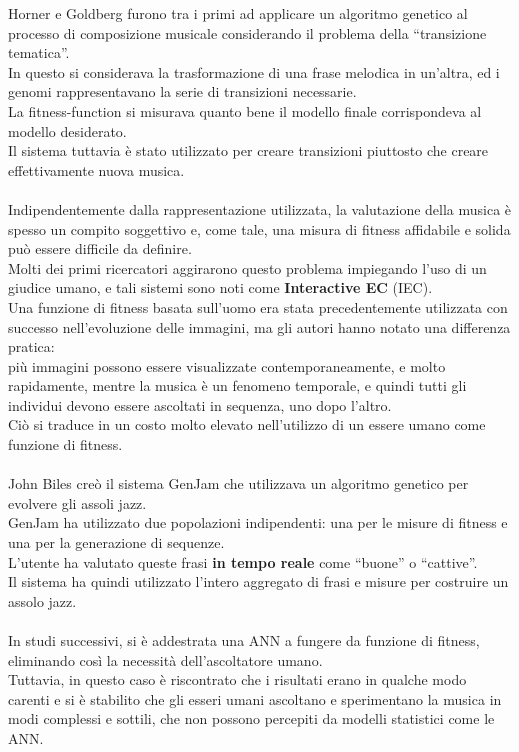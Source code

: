 \documentclass[a4paper,12pt]{report}
\begin{document}
Horner e Goldberg furono tra i primi ad applicare un algoritmo genetico al processo di composizione musicale considerando il problema della “transizione tematica”. \\
In questo si considerava la trasformazione di una frase melodica in un'altra, ed i genomi rappresentavano la serie di transizioni necessarie.  \\
La fitness-function si misurava quanto bene il modello finale corrispondeva al modello desiderato. \\
Il sistema tuttavia è stato utilizzato per creare transizioni piuttosto che creare effettivamente nuova musica. \\
\\
Indipendentemente dalla rappresentazione utilizzata, la valutazione della musica è spesso un compito soggettivo e, come tale, una misura di fitness affidabile e solida può essere difficile da definire. \\
Molti dei primi ricercatori aggirarono questo problema impiegando l'uso di un giudice umano, e tali sistemi sono noti come \textbf{Interactive EC} (IEC). \\
Una funzione di fitness basata sull’uomo era stata precedentemente utilizzata con successo nell’evoluzione delle immagini, 
ma gli autori hanno notato una differenza pratica: \\
più immagini possono essere visualizzate contemporaneamente, e molto rapidamente, 
mentre la musica è un fenomeno temporale, e quindi tutti gli individui devono essere ascoltati in sequenza, uno dopo l'altro. \\
Ciò si traduce in un costo molto elevato nell’utilizzo di un essere umano come funzione di fitness. \\
\\
John Biles creò il sistema GenJam che utilizzava un algoritmo genetico per evolvere gli assoli jazz. \\
GenJam ha utilizzato due popolazioni indipendenti: una per le misure di fitness e una per la generazione di sequenze. \\
L’utente ha valutato queste frasi \textbf{in tempo reale} come “buone” o “cattive”. \\
Il sistema ha quindi utilizzato l'intero aggregato di frasi e misure per costruire un assolo jazz. \\
\\
In studi successivi, si è addestrata una ANN a fungere da funzione di fitness, eliminando così la necessità dell'ascoltatore umano. \\
Tuttavia, in questo caso è riscontrato che i risultati erano in qualche modo carenti e si è stabilito che gli esseri umani ascoltano e sperimentano la musica in modi complessi e sottili, che non possono percepiti da modelli statistici come le ANN. \\
\end{document}
